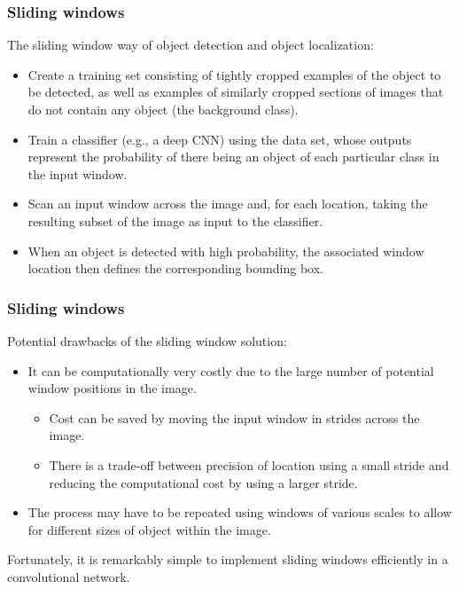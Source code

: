 \documentclass{beamer}
\begin{document}
\begin{frame}
    \frametitle{Sliding windows}
    The sliding window way of object detection and object localization:
    \begin{itemize}
        \item Create a training set consisting of tightly cropped examples of the object to be detected, as well as examples of similarly cropped sections of images that do not contain any object (the background class).
        \item Train a classifier (e.g., a deep CNN) using the data set, whose outputs represent the probability of there being an object of each particular class in the input window.
        \item Scan an input window across the image and, for each location, taking the resulting subset of the image as input to the classifier.
        \item When an object is detected with high probability, the associated window location then defines the corresponding bounding box.
    \end{itemize}
\end{frame}

\begin{frame}
    \frametitle{Sliding windows}
    Potential drawbacks of the sliding window solution:
    \begin{itemize}
        \item It can be computationally very costly due to the large number of potential window positions in the image.
        \begin{itemize}
            \item Cost can be saved by moving the input window in strides across the image.
            \item There is a trade-off between precision of location using a small stride and reducing the computational cost by using a larger stride.
        \end{itemize}
        \item The process may have to be repeated using windows of various scales to allow for different sizes of object within the image.
    \end{itemize}
    Fortunately, it is remarkably simple to implement sliding windows efficiently in a convolutional network.
\end{frame}
\end{document}
